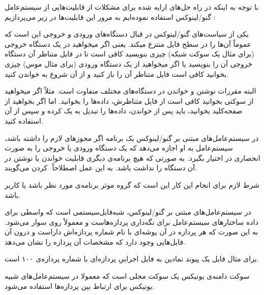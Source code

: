 
با توجه به اینکه در راه حل‌های ارایه شده برای مشکلات از قابلیت‌هایی از سیستم‌عامل گنو/لینوکس استفاده نموده‌ایم به مرور این قابلیت‌ها در زیر می‌پردازیم :

یکی از سیاست‌های گنو/لینوکس در قبال دستگاه‌های ورودی و خروجی این است که عموماً آن‌ها را در سطح فایل منتزع میکند. یعنی اگر میخواهید در یک دستگاه خروجی (برای مثال یک سوکت شبکه) چیزی بنویسید کافی است تا در فایل متناظر آن دستگاه خروجی آن را بنویسید یا اگر میخواهید از یک دستگاه ورودی (برای مثال موس) چیزی بخوانید کافی است فایل متناظر آن را باز کنید و از آن شروع به خواندن کنید.

البته مقررات نوشتن و خواندن در دستگاه‌های مختلف متفاوت است. مثلاً اگر میخواهید از سوکتی بخوانید کافی است از فایل متناظرش، داده‌ها را بخوانید. اما اگر بخواهید از صفحه‌کلید بخوانید، باید پس از خواندن، داده‌ها را تبدیل به یک  کرده و سپس از آن استفاده کنید.

در سیستم‌عامل‌های مبتنی بر گنو/لینوکس یک برنامه اگر مجوز‌های لازم را داشته باشد، سیستم‌عامل به او اجازه می‌دهد که یک دستگاه ورودی یا خروجی را به صورت انحصاری در اختیار بگیرد. به صورتی که هیچ برنامه‌ی دیگری قابلیت خواندن یا نوشتن در آن دستگاه را نداشت باشد. به این عمل اصطلاحاً ‌ کردن می‌گویند. 

شرط لازم برای انجام این کار این است که گروه موثر برنامه‌ی مورد نظر  باشد یا کاربر  باشد.


در سیستم‌عامل‌های مبتنی بر گنو/لینوکس،  شبه‌فایل‌سیستمی است که واسطی برای داده ساختارهای سیستم‌عامل برای نگه‌داری پردازه‌هاست و معمولاً روی  سوار می‌شود. به این صورت که هر پردازه در آن پوشه‌ای با نام شماره پردازه‌اش داراست و درون آن فایل‌هایی وجود دارد که مشخصات آن پردازه را نشان می‌دهد.

برای مثال فایل  یک پیوند نمادین به فایل اجراییِ پردازه‌ای با شماره پردازه‌ی ۱۰۰ است. 

سوکت دامنه‌ی یونیکس یک سوکت محلی است که معمولا در سیستم‌عامل‌های شبیه یونیکس برای ارتباط بین پردازه‌ها  استفاده می‌شود. 


